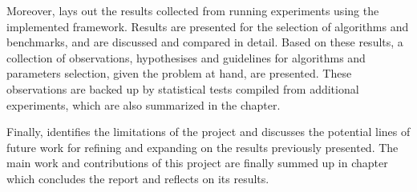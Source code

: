Moreover,  lays out the results collected from running experiments using the implemented framework.
Results are presented for the selection of algorithms and benchmarks, and are discussed and compared in detail. Based on these results, a collection of
observations, hypothesises and guidelines for algorithms and parameters selection, given the problem at hand, are presented. These observations are
backed up by statistical tests compiled from additional experiments, which are also summarized in the chapter.

Finally,  identifies the limitations of the project and discusses the potential lines of future work for refining and expanding on the results
previously presented. The main work and contributions of this project are finally summed up in chapter  which concludes the report and reflects on its
results.
